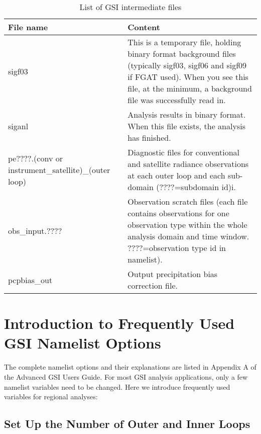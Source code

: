 \begin{table}[htbp]
\centering
\caption{List of GSI intermediate files}
\begin{tabular}{|p{5cm}|p{10cm}|}
\hline
\hline
File name &	Content \\
\hline
sigf03 & This is a temporary file, holding binary format background files (typically sigf03, sigf06 and sigf09 if FGAT used). When you see this file, at the minimum, a background file was successfully read in.\\
\hline
siganl & Analysis results in binary format. When this file exists, the analysis has finished.\\
\hline
pe????.(conv or instrument\_satellite)\_(outer loop) &	Diagnostic files for conventional and satellite radiance observations at each outer loop and each sub-domain (????=subdomain id)i.\\
\hline
obs\_input.???? & Observation scratch files (each file contains observations for one observation type within the whole analysis domain and time window. ????=observation type id in namelist).\\
\hline
pcpbias\_out &	Output precipitation bias correction file.\\
\hline
\end{tabular}
\label{t37}
\end{table} 



\section{Introduction to Frequently Used GSI Namelist Options}

The complete namelist options and their explanations are listed in Appendix A of the Advanced GSI User\textquotesingle s Guide. For most GSI analysis applications, only a few namelist variables need to be changed. Here we introduce frequently used variables for regional analyses: 

\subsection{Set Up the Number of Outer and Inner Loops}

